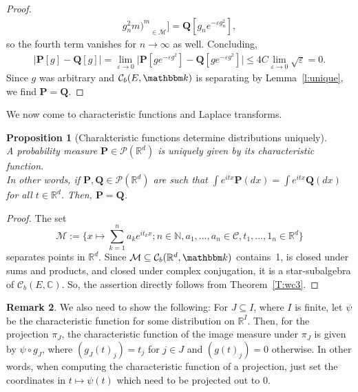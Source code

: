 \documentclass{article}
\newtheorem{proposition}{Proposition}[section]
\theoremstyle{definition}
\newtheorem{remark}[proposition]{Remark}
\theoremstyle{step} \newtheorem{step}{Step}
\begin{document}
\begin{proof}
\begin{align*}
{{          g_n^2}{m}\Big)^m}_{\in\mathcal M}\Big] = \mathbf
    Q[g_ne^{-\varepsilon g_n^2}],
  \end{align*}
  so the fourth term vanishes for $n\to\infty$ as well. Concluding,
  \begin{align*}
    \big|\mathbf P[g] - \mathbf Q[g] \big| = \lim_{\varepsilon\to 0}
    \big|\mathbf P[ge^{-\varepsilon g^2}] - \mathbf Q[ge^{-\varepsilon
            g^2}] \big| \leq 4C \lim_{\varepsilon \to 0}\sqrt{\varepsilon} =
    0.
  \end{align*}
  Since $g$ was arbitrary and $\mathcal C_b(E,\mathbbm k)$ is
  separating by Lemma~\ref{l:unique}, we find $\mathbf P = \mathbf Q$.
\end{proof}

\noindent
We now come to characteristic functions and Laplace transforms.

\begin{proposition}[Charakteristic functions determine distributions uniquely]
  \label{Pr:char1}\mbox{}\\
  A probability measure $\mathbf P \in\mathcal P(\mathbb R^d)$ is
  uniquely given by its characteristic function.  \\ In other words,
  if $\mathbf P, \mathbf Q \in\mathcal P(\mathbb R^d)$ are such that
  $\int e^{itx} \mathbf P(dx) = \int e^{itx} \mathbf Q(dx)$ for all
  $t\in\mathbb R^d$. Then, $\mathbf P = \mathbf Q$.
\end{proposition}

\begin{proof}
  The set
  $$\mathcal M:= \Big\{ x\mapsto \sum_{k=1}^n a_k e^{i t_k x}; n \in
  \mathbb N, a_1,...,a_n \in \mathcal C, t_1,...,1_n\in\mathbb
  R^d\Big\}$$ separates points in $\mathbb R^d$. Since $\mathcal M
  \subseteq \mathcal C_b(\mathbb R^d,\mathbbm k)$ contains~1, is
  closed under sums and products, and closed under complex
  conjugation, it is a star-subalgebra of $\mathcal C_b(E,\mathbb
  C)$. So, the assertion directly follows from Theorem~\ref{T:wc3}.
\end{proof}

\begin{remark}\label{rem:proj}
  We also need to show the following: For $J \subseteq I$, where $I$
  is finite, let $\psi$ be the characteristic function for some
  distribution on $\mathbb R^I$. Then, for the projection $\pi_J$, the
  characteristic function of the image measure under $\pi_J$ is given
  by $\psi \circ g_J$, where $(g_J(t)_j) = t_j$ for $j\in J$ and
  $(g(t)_j) = 0$ otherwise. In other words, when computing the
  characteristic function of a projection, just set the coordinates in
  $t \mapsto \psi(t)$ which need to be projected out to $0$.
\end{remark}
\end{document}
